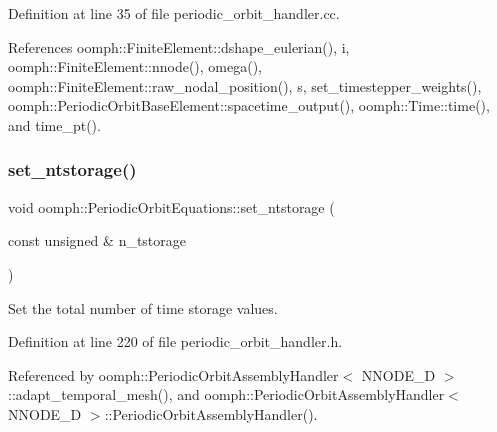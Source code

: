 Definition at line 35 of file periodic\+\_\+orbit\+\_\+handler.\+cc.



References oomph\+::\+Finite\+Element\+::dshape\+\_\+eulerian(), i, oomph\+::\+Finite\+Element\+::nnode(), omega(), oomph\+::\+Finite\+Element\+::raw\+\_\+nodal\+\_\+position(), s, set\+\_\+timestepper\+\_\+weights(), oomph\+::\+Periodic\+Orbit\+Base\+Element\+::spacetime\+\_\+output(), oomph\+::\+Time\+::time(), and time\+\_\+pt().

\mbox{\label{classoomph_1_1PeriodicOrbitEquations_aaed37b9539f2f77d642a18fdd1e13e88}} 
\subsubsection{\texorpdfstring{set\+\_\+ntstorage()}{set\_ntstorage()}}
{\footnotesize\ttfamily void oomph\+::\+Periodic\+Orbit\+Equations\+::set\+\_\+ntstorage (\begin{DoxyParamCaption}\item[{const unsigned \&}]{n\+\_\+tstorage }\end{DoxyParamCaption})\hspace{0.3cm}{\ttfamily [inline]}}



Set the total number of time storage values. 



Definition at line 220 of file periodic\+\_\+orbit\+\_\+handler.\+h.



Referenced by oomph\+::\+Periodic\+Orbit\+Assembly\+Handler$<$ N\+N\+O\+D\+E\+\_\+D $>$\+::adapt\+\_\+temporal\+\_\+mesh(), and oomph\+::\+Periodic\+Orbit\+Assembly\+Handler$<$ N\+N\+O\+D\+E\+\_\+D $>$\+::\+Periodic\+Orbit\+Assembly\+Handler().

\mbox{\label{classoomph_1_1PeriodicOrbitEquations_a253f5b0748b61c8f68d030b861ccd025}} 
